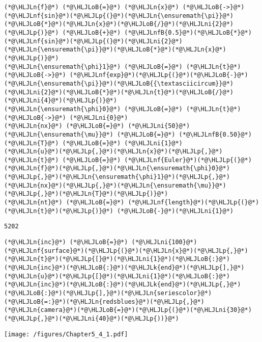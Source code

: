 \documentclass[12pt,a4paper]{article}
\newcommand{\HLJLk}[1]{\textcolor[RGB]{148,91,176}{\textbf{#1}}}
\newcommand{\HLJLn}[1]{#1}
\newcommand{\HLJLnf}[1]{\textcolor[RGB]{66,102,213}{#1}}
\newcommand{\HLJLnfB}[1]{\textcolor[RGB]{59,151,46}{#1}}
\newcommand{\HLJLni}[1]{\textcolor[RGB]{59,151,46}{#1}}
\newcommand{\HLJLoB}[1]{\textcolor[RGB]{102,102,102}{\textbf{#1}}}
\newcommand{\HLJLp}[1]{#1}
\begin{document}
\begin{lstlisting}
(*@\HLJLn{f}@*) (*@\HLJLoB{=}@*) (*@\HLJLn{x}@*) (*@\HLJLoB{->}@*) (*@\HLJLnf{sin}@*)(*@\HLJLp{(}@*)(*@\HLJLn{\ensuremath{\pi}}@*)(*@\HLJLoB{*}@*)(*@\HLJLn{x}@*)(*@\HLJLoB{/}@*)(*@\HLJLni{2}@*)(*@\HLJLp{)}@*) (*@\HLJLoB{+}@*) (*@\HLJLnfB{0.5}@*)(*@\HLJLoB{*}@*)(*@\HLJLnf{sin}@*)(*@\HLJLp{(}@*)(*@\HLJLni{2}@*)(*@\HLJLn{\ensuremath{\pi}}@*)(*@\HLJLoB{*}@*)(*@\HLJLn{x}@*)(*@\HLJLp{)}@*)
(*@\HLJLn{\ensuremath{\phi}1}@*) (*@\HLJLoB{=}@*) (*@\HLJLn{t}@*) (*@\HLJLoB{->}@*) (*@\HLJLnf{exp}@*)(*@\HLJLp{(}@*)(*@\HLJLoB{-}@*)(*@\HLJLn{\ensuremath{\pi}}@*)(*@\HLJLoB{{\textasciicircum}}@*)(*@\HLJLni{2}@*)(*@\HLJLoB{*}@*)(*@\HLJLn{t}@*)(*@\HLJLoB{/}@*)(*@\HLJLni{4}@*)(*@\HLJLp{)}@*)
(*@\HLJLn{\ensuremath{\phi}0}@*) (*@\HLJLoB{=}@*) (*@\HLJLn{t}@*) (*@\HLJLoB{->}@*) (*@\HLJLni{0}@*)
(*@\HLJLn{nx}@*) (*@\HLJLoB{=}@*) (*@\HLJLni{50}@*)
(*@\HLJLn{\ensuremath{\mu}}@*) (*@\HLJLoB{=}@*) (*@\HLJLnfB{0.50}@*)
(*@\HLJLn{T}@*) (*@\HLJLoB{=}@*) (*@\HLJLni{1}@*)
(*@\HLJLn{u}@*)(*@\HLJLp{,}@*)(*@\HLJLn{x}@*)(*@\HLJLp{,}@*)(*@\HLJLn{t}@*) (*@\HLJLoB{=}@*) (*@\HLJLnf{Euler}@*)(*@\HLJLp{(}@*)(*@\HLJLn{f}@*)(*@\HLJLp{,}@*)(*@\HLJLn{\ensuremath{\phi}0}@*)(*@\HLJLp{,}@*)(*@\HLJLn{\ensuremath{\phi}1}@*)(*@\HLJLp{,}@*)(*@\HLJLn{nx}@*)(*@\HLJLp{,}@*)(*@\HLJLn{\ensuremath{\mu}}@*)(*@\HLJLp{,}@*)(*@\HLJLn{T}@*)(*@\HLJLp{)}@*)
(*@\HLJLn{nt}@*) (*@\HLJLoB{=}@*) (*@\HLJLnf{length}@*)(*@\HLJLp{(}@*)(*@\HLJLn{t}@*)(*@\HLJLp{)}@*) (*@\HLJLoB{-}@*)(*@\HLJLni{1}@*)
\end{lstlisting}

\begin{lstlisting}
5202
\end{lstlisting}


\begin{lstlisting}
(*@\HLJLn{inc}@*) (*@\HLJLoB{=}@*) (*@\HLJLni{100}@*)
(*@\HLJLnf{surface}@*)(*@\HLJLp{(}@*)(*@\HLJLn{x}@*)(*@\HLJLp{,}@*)(*@\HLJLn{t}@*)(*@\HLJLp{[}@*)(*@\HLJLni{1}@*)(*@\HLJLoB{:}@*)(*@\HLJLn{inc}@*)(*@\HLJLoB{:}@*)(*@\HLJLk{end}@*)(*@\HLJLp{],}@*)(*@\HLJLn{u}@*)(*@\HLJLp{[}@*)(*@\HLJLni{1}@*)(*@\HLJLoB{:}@*)(*@\HLJLn{inc}@*)(*@\HLJLoB{:}@*)(*@\HLJLk{end}@*)(*@\HLJLp{,}@*)(*@\HLJLoB{:}@*)(*@\HLJLp{],}@*)(*@\HLJLn{seriescolor}@*)(*@\HLJLoB{=:}@*)(*@\HLJLn{redsblues}@*)(*@\HLJLp{,}@*) (*@\HLJLn{camera}@*)(*@\HLJLoB{=}@*)(*@\HLJLp{(}@*)(*@\HLJLni{30}@*)(*@\HLJLp{,}@*)(*@\HLJLni{40}@*)(*@\HLJLp{))}@*)
\end{lstlisting}

\texttt{[image: /figures/Chapter5\_4\_1.pdf]}
\end{document}
